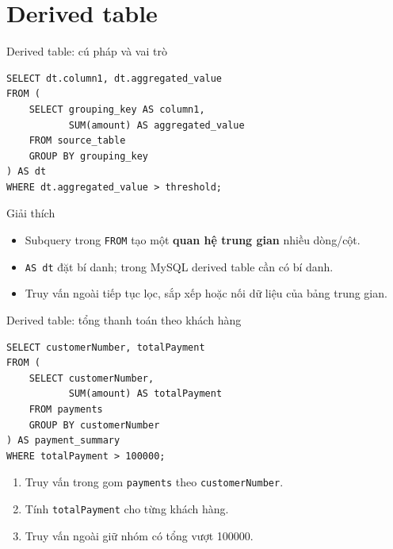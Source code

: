 \documentclass[aspectratio=169,10pt]{beamer}
\newcommand{\code}[1]{\texttt{#1}}
\begin{document}
\section{Derived table}

\begin{frame}[fragile]{Derived table: cú pháp và vai trò}
\begin{lstlisting}
SELECT dt.column1, dt.aggregated_value
FROM (
    SELECT grouping_key AS column1,
           SUM(amount) AS aggregated_value
    FROM source_table
    GROUP BY grouping_key
) AS dt
WHERE dt.aggregated_value > threshold;
\end{lstlisting}
\begin{block}{Giải thích}
\begin{itemize}
\item Subquery trong \code{FROM} tạo một \textbf{quan hệ trung gian} nhiều dòng/cột.
\item \code{AS dt} đặt bí danh; trong MySQL derived table cần có bí danh.
\item Truy vấn ngoài tiếp tục lọc, sắp xếp hoặc nối dữ liệu của bảng trung gian.
\end{itemize}
\end{block}
\end{frame}

\begin{frame}[fragile]{Derived table: tổng thanh toán theo khách hàng}
\begin{lstlisting}
SELECT customerNumber, totalPayment
FROM (
    SELECT customerNumber,
           SUM(amount) AS totalPayment
    FROM payments
    GROUP BY customerNumber
) AS payment_summary
WHERE totalPayment > 100000;
\end{lstlisting}
\begin{enumerate}
\item Truy vấn trong gom \code{payments} theo \code{customerNumber}.
\item Tính \code{totalPayment} cho từng khách hàng.
\item Truy vấn ngoài giữ nhóm có tổng vượt 100000.
\end{enumerate}
\end{frame}
\end{document}

